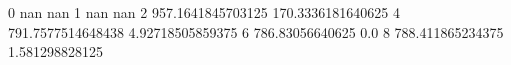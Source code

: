 0 nan nan
1 nan nan
2 957.1641845703125 170.3336181640625
4 791.7577514648438 4.92718505859375
6 786.83056640625 0.0
8 788.411865234375 1.581298828125
